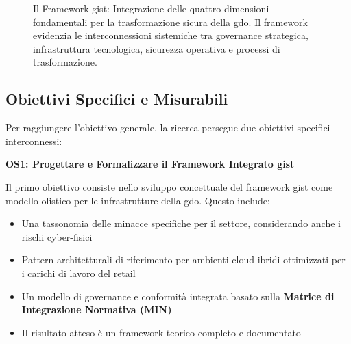 \begin{figure}[H]
\caption[Il Framework \gls{gist}: Integrazione delle quattro dimensioni fondamentali per la trasformazione sicura della \gls{gdo}]{Il Framework \gls{gist}: Integrazione delle quattro dimensioni fondamentali per la trasformazione sicura della \gls{gdo}. Il framework evidenzia le interconnessioni sistemiche tra governance strategica, infrastruttura tecnologica, sicurezza operativa e processi di trasformazione.}
\label{fig:gist_framework}
\end{figure}

\subsection{\texorpdfstring{Obiettivi Specifici e Misurabili}{1.3.2 - Obiettivi Specifici e Misurabili}}
\label{subsec:obiettivi_specifici}

Per raggiungere l'obiettivo generale, la ricerca persegue due obiettivi specifici interconnessi:

\textbf{OS1: Progettare e Formalizzare il Framework Integrato \gls{gist}}

Il primo obiettivo consiste nello sviluppo concettuale del framework \gls{gist} come modello olistico per le infrastrutture della \gls{gdo}. Questo include:
\begin{itemize}
\item Una tassonomia delle minacce specifiche per il settore, considerando anche i rischi cyber-fisici
\item Pattern architetturali di riferimento per ambienti cloud-ibridi ottimizzati per i carichi di lavoro del retail
\item Un modello di governance e conformità integrata basato sulla \textbf{Matrice di Integrazione Normativa (MIN)}
\item Il risultato atteso è un framework teorico completo e documentato
\end{itemize}

